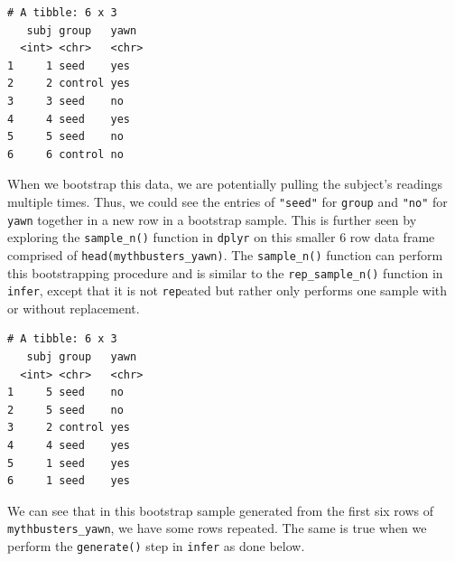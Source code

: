 \documentclass[]{article}
\newenvironment{Shaded}{\begin{snugshade}}{\end{snugshade}}
\newcommand{\KeywordTok}[1]{\textcolor[rgb]{0.13,0.29,0.53}{\textbf{#1}}}
\newcommand{\DataTypeTok}[1]{\textcolor[rgb]{0.13,0.29,0.53}{#1}}
\newcommand{\DecValTok}[1]{\textcolor[rgb]{0.00,0.00,0.81}{#1}}
\newcommand{\StringTok}[1]{\textcolor[rgb]{0.31,0.60,0.02}{#1}}
\newcommand{\OtherTok}[1]{\textcolor[rgb]{0.56,0.35,0.01}{#1}}
\newcommand{\OperatorTok}[1]{\textcolor[rgb]{0.81,0.36,0.00}{\textbf{#1}}}
\newcommand{\NormalTok}[1]{#1}
\begin{document}
\begin{verbatim}
# A tibble: 6 x 3
   subj group   yawn 
  <int> <chr>   <chr>
1     1 seed    yes  
2     2 control yes  
3     3 seed    no   
4     4 seed    yes  
5     5 seed    no   
6     6 control no   
\end{verbatim}

When we bootstrap this data, we are potentially pulling the subject's
readings multiple times. Thus, we could see the entries of
\texttt{"seed"} for \texttt{group} and \texttt{"no"} for \texttt{yawn}
together in a new row in a bootstrap sample. This is further seen by
exploring the \texttt{sample\_n()} function in \texttt{dplyr} on this
smaller 6 row data frame comprised of \texttt{head(mythbusters\_yawn)}.
The \texttt{sample\_n()} function can perform this bootstrapping
procedure and is similar to the \texttt{rep\_sample\_n()} function in
\texttt{infer}, except that it is not \texttt{rep}eated but rather only
performs one sample with or without replacement.

\begin{Shaded}
\end{Shaded}

\begin{verbatim}
# A tibble: 6 x 3
   subj group   yawn 
  <int> <chr>   <chr>
1     5 seed    no   
2     5 seed    no   
3     2 control yes  
4     4 seed    yes  
5     1 seed    yes  
6     1 seed    yes  
\end{verbatim}

We can see that in this bootstrap sample generated from the first six
rows of \texttt{mythbusters\_yawn}, we have some rows repeated. The same
is true when we perform the \texttt{generate()} step in \texttt{infer}
as done below.

\begin{Shaded}
\end{Shaded}
\end{document}
